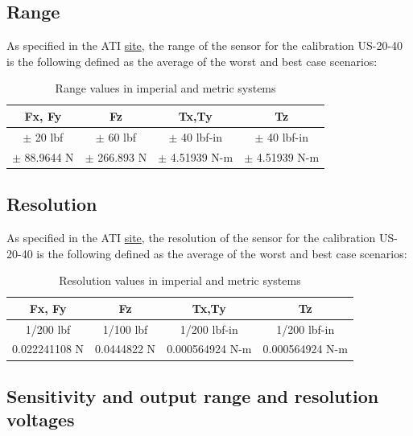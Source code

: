 \documentclass[a4paper]{article}
\begin{document}
\subsection{Range}
As specified in the ATI \hyperref{https://www.ati-ia.com/products/ft/ft_models.aspx?id=mini40}{category}{name}{site}, the range of the sensor for the calibration US-20-40 is the following defined as the average of the worst and best case
scenarios:

\begin{table}[h!]
	\centering
	\caption{Range values in imperial and metric systems\label{tab:range}}
	\begin{tabular}{||c | c | c | c||} 
		\hline
		Fx, Fy & Fz & Tx,Ty & Tz \\ [0.5ex] 
		\hline\hline
		$\pm$ 20 lbf & $\pm$ 60 lbf & $\pm$ 40 lbf-in & $\pm$ 40 lbf-in\\ 
		\hline
		$\pm$ 88.9644 N & $\pm$ 266.893 N & $\pm$ 4.51939 N-m & $\pm$ 4.51939 N-m \\
		\hline
		
	\end{tabular}
\end{table}



\subsection{Resolution}
As specified in the ATI \hyperref{https://www.ati-ia.com/products/ft/ft_models.aspx?id=mini40}{category}{name}{site}, the resolution of the sensor for the calibration US-20-40 is the following defined as the average of the worst and best case
scenarios:

\begin{table}[h!]
	\centering
	\caption{Resolution values in imperial and metric systems\label{tab:resolution}}
	\begin{tabular}{||c | c | c | c||} 
		\hline
		Fx, Fy & Fz & Tx,Ty & Tz \\ [0.5ex] 
		\hline\hline
		1/200 lbf & 1/100 lbf & 1/200 lbf-in & 1/200 lbf-in\\ 
		\hline
		0.022241108 N & 0.0444822 N & 0.000564924 N-m & 0.000564924 N-m \\
		\hline
	\end{tabular}
\end{table}

\subsection{Sensitivity and output range and resolution voltages}
\end{document}
